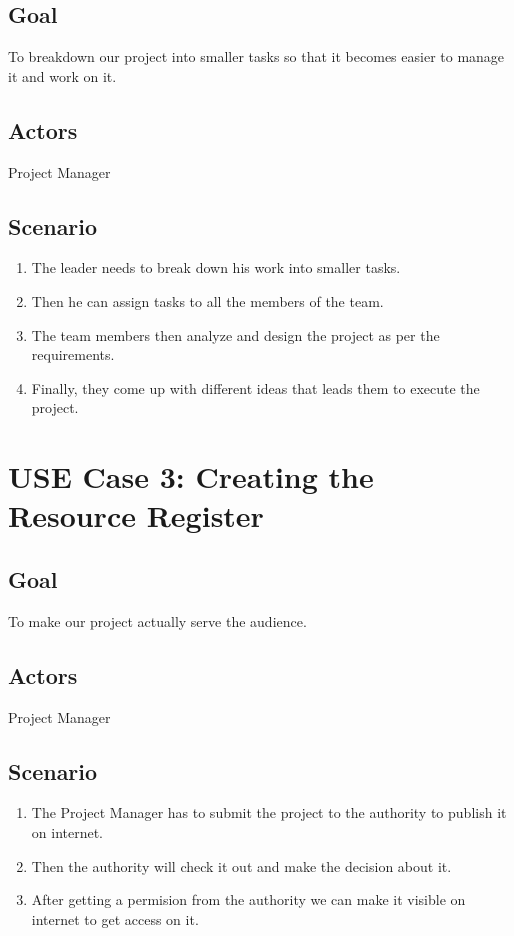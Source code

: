\documentclass[10pt]{article}
\begin{document}
\subsection{Goal}
To breakdown our project into smaller tasks so that it becomes easier to manage it and work on it.
\subsection{Actors}
Project Manager
\subsection{Scenario}
\begin{enumerate}
\item The leader needs to break down his work into smaller tasks.
\item Then he can assign tasks to all the members of the team.
\item The team members then analyze and design the project as per the requirements.
\item Finally, they come up with different ideas that leads them to execute the project.
\end{enumerate}

\section{USE Case 3: Creating the Resource Register}
\subsection{Goal}
 To make our project actually serve the audience.
\subsection{Actors}
Project Manager 
\subsection{Scenario}

\begin{enumerate}
\item The Project Manager has to submit the project to the authority to publish it on internet.
\item Then the authority will check it out and make the decision about it.
\item After getting a permision from the authority we can make it visible on internet to get access on it.

\end{enumerate}
\end{document}
